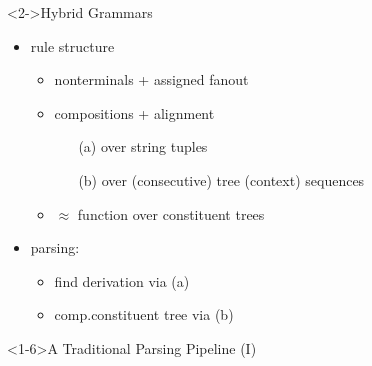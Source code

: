 \documentclass[aspectratio=169, 10pt]{beamer}
\begin{document}
    \begin{frame}<2->{Hybrid Grammars \citep{Ned14}}
        \begin{minipage}{.58\linewidth}
                    \resizebox{\linewidth}{!}{
                        }%
        \end{minipage}
    \hfill
        \begin{minipage}{.4\linewidth}
            \begin{itemize}
                \item rule structure
                    \begin{itemize}
                        \item \alert<2>{nonterminals} + \alert<3-6>{assigned fanout}
                        \item \alert<4-12>{compositions} + \alert<11-12>{alignment}
                            \begin{itemize}
                                \item[(a)] \alert<4-8>{over string tuples}
                                \item[(b)] \alert<9-10>{over (consecutive) tree (context) sequences}
                            \end{itemize}
                        \item<13-> \alert<13>{\(\approx\) function over constituent trees}
                    \end{itemize}
                \item<21-> parsing:
                \begin{itemize}
                    \item find derivation via (a)
                    \item comp.\@ constituent tree via (b)
                \end{itemize}
            \end{itemize}
        \end{minipage}
    \end{frame}

    \begin{frame}<1-6>{A Traditional Parsing Pipeline (I)}
        \resizebox{\linewidth}{!}{}
    \end{frame}
\end{document}
